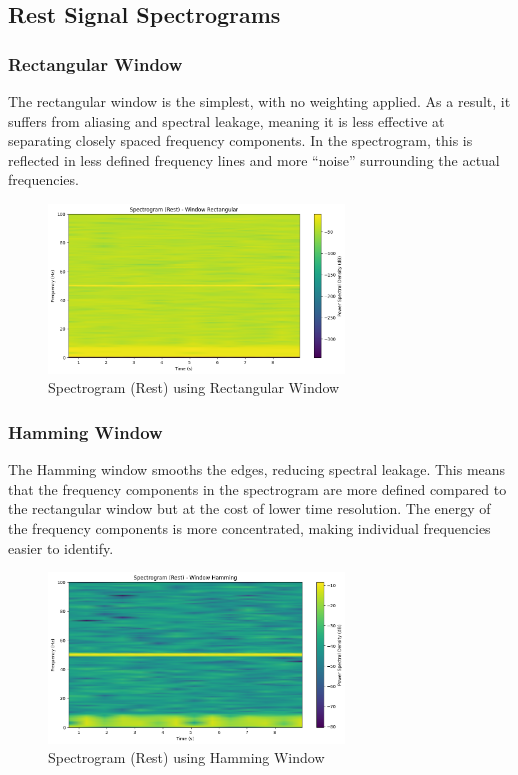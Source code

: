 \documentclass[10pt]{article}
\theoremstyle{definition}
\theoremstyle{remark}
\theoremstyle{definition}
\numberwithin{equation}{prob}
\begin{document}
\subsection*{Rest Signal Spectrograms}

\subsubsection{Rectangular Window}
The rectangular window is the simplest, with no weighting applied. As a result, it suffers from aliasing and spectral leakage, meaning it is less effective at separating closely spaced frequency components. In the spectrogram, this is reflected in less defined frequency lines and more ``noise'' surrounding the actual frequencies.

\begin{figure}[H]
    \centering
    \includegraphics[width=0.7\textwidth]{./figures/Spectrogram (Rest) - Window Rectangular.png}
    \caption{Spectrogram (Rest) using Rectangular Window}
\end{figure}

\subsubsection{Hamming Window}
The Hamming window smooths the edges, reducing spectral leakage. This means that the frequency components in the spectrogram are more defined compared to the rectangular window but at the cost of lower time resolution. The energy of the frequency components is more concentrated, making individual frequencies easier to identify.

\begin{figure}[H]
    \centering
    \includegraphics[width=0.7\textwidth]{./figures/Spectrogram (Rest) - Window Hamming.png}
    \caption{Spectrogram (Rest) using Hamming Window}
\end{figure}
\end{document}
